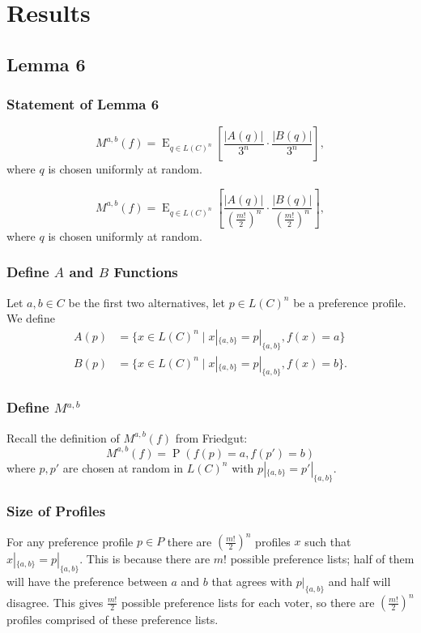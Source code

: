 \documentclass[aspectratio=169]{beamer}
\DeclareMathOperator{\probability}{P}
\DeclareMathOperator{\expectedvalue}{E}
\begin{document}
	\section{Results}
	\subsection{Lemma 6}

		\begin{frame}
			\frametitle{Statement of Lemma 6}

			\begin{lemma}
				\[
					M^{a,b}(f) = \expectedvalue_{q \in L(C)^n} \left[ \frac{|A(q)|}{3^n} \cdot \frac{|B(q)|}{3^n} \right],
				\]
				where $q$ is chosen uniformly at random.
			\end{lemma}

			\begin{lemma}
				\[
					M^{a,b}(f) = \expectedvalue_{q \in L(C)^n} \left[ \frac{|A(q)|}{\left(\frac{m!}{2}\right)^n} \cdot \frac{|B(q)|}{\left(\frac{m!}{2}\right)^n} \right],
				\]
				where $q$ is chosen uniformly at random.
			\end{lemma}
		\end{frame}

		\begin{frame}
			\frametitle{Define $A$ and $B$ Functions}

			Let $a, b \in C$ be the first two alternatives, let $p \in L(C)^n$ be a preference profile. We define
			\begin{align*}
				A(p) &= \{x \in L(C)^n \mid x|_{\{a,b\}} = p|_{\{a,b\}}, f(x) = a\} \\
				B(p) &= \{x \in L(C)^n \mid x|_{\{a,b\}} = p|_{\{a,b\}}, f(x) = b\}.
			\end{align*}
		\end{frame}

		\begin{frame}
			\frametitle{Define $M^{a,b}$}

			Recall the definition of $M^{a,b}(f)$ from Friedgut:
			\[
				M^{a,b}(f) = \probability(f(p) = a, f(p') = b)
			\]
			where $p, p'$ are chosen at random in $L(C)^n$ with $p|_{\{a,b\}} = p'|_{\{a,b\}}$.
		\end{frame}

		\begin{frame}
			\frametitle{Size of Profiles}

			For any preference profile $p \in P$ there are $(\frac{m!}{2})^n$ profiles $x$ such that $x|_{\{a, b\}} = p|_{\{a, b\}}$. This is because there are $m!$ possible preference lists; half of them will have the preference between $a$ and $b$ that agrees with $p|_{\{a, b\}}$ and half will disagree. This gives $\frac{m!}{2}$ possible preference lists for each voter, so there are $(\frac{m!}{2})^n$ profiles comprised of these preference lists.
		\end{frame}
\end{document}
